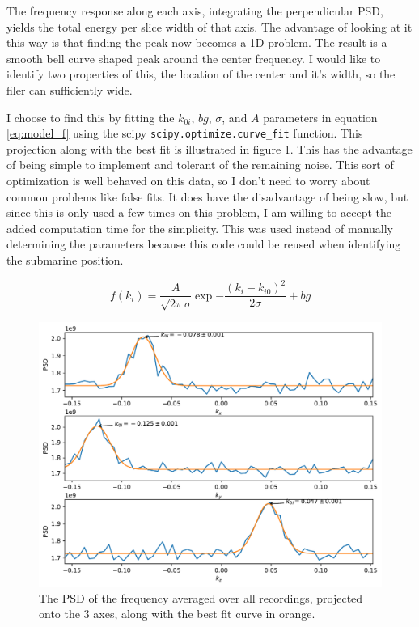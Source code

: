 \documentclass{article}
\begin{document}
    The frequency response along each axis, integrating the perpendicular PSD, yields the total energy per slice width of that axis. The advantage of looking at it this way is that finding the peak now becomes a 1D problem. The result is a smooth bell curve shaped peak around the center frequency. I would like to identify two properties of this, the location of the center and it's width, so the filer can sufficiently wide.

    I choose to find this by fitting the $k_{0i}$, $bg$, $\sigma$, and $A$ parameters in equation \ref{eq:model_f} using the scipy \lstinline{scipy.optimize.curve_fit} function. This projection along with the best fit is illustrated in figure \ref{fig:axes_fit}. This has the advantage of being simple to implement and tolerant of the remaining noise. This sort of optimization is well behaved on this data, so I don't need to worry about common problems like false fits. It does have the disadvantage of being slow, but since this is only used a few times on this problem, I am willing to accept the added computation time for the simplicity. This was used instead of manually determining the parameters because this code could be reused when identifying the submarine position.

    \begin{equation} \label{eq:model_f}
        f(k_i) = \frac{A}{\sqrt{2 \pi} \sigma} \exp{-\frac{(k_i - k_{i0})^2}{2 \sigma}} + bg
    \end{equation}

    \begin{figure} \label{fig:axes_fit}
        \centering
        \includegraphics[width=\textwidth]{axes_fit.pdf}
        \caption{The PSD of the frequency averaged over all recordings, projected onto the 3 axes, along with the best fit curve in orange.}
    \end{figure}
\end{document}

